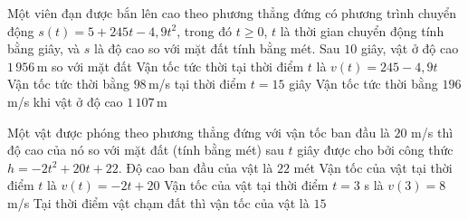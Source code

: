 \begin{ex}%
	 Một viên đạn được bắn lên cao theo phương thẳng đứng có phương trình chuyển động $s(t)=5+245t-4{,}9t^2$, trong đó $t\ge 0$, $t$ là thời gian chuyển động tính bằng giây, và $s$ là độ cao so với mặt đất tính bằng mét.
	\choiceTF 
		{Sau $10$ giây, vật ở  độ cao $1\,956$\,m so với mặt đất}
		 {Vận tốc tức thời tại thời điểm $t$ là $v(t)=245-4{,}9t$}
		{\True Vận tốc tức thời bằng $98$\,m/s tại thời  điểm $t=15$ giây}
		{Vận tốc tức  thời bằng $196$ m/s khi vật ở độ cao $1\,107$\,m}
\end{ex}

\begin{ex}%
	Một vật được phóng theo phương thẳng đứng với vận tốc ban đầu là $ 20 $ m/s thì độ cao của nó so với mặt đất (tính bằng mét) sau $t$ giây được  cho bởi công thức $h=-2t^2+20t+22$.
	 \choiceTF
		{\True Độ cao ban đầu của vật là $ 22  $ mét}
		{Vận tốc của vật tại thời  điểm $t$ là $v(t)=-2t+20$}
		{\True Vận tốc của vật tại  thời điểm $t=3$ s là $v(3)=8$ m/s}
		{Tại thời điểm vật chạm đất thì vận tốc của vật là $  15 $}
\end{ex}


